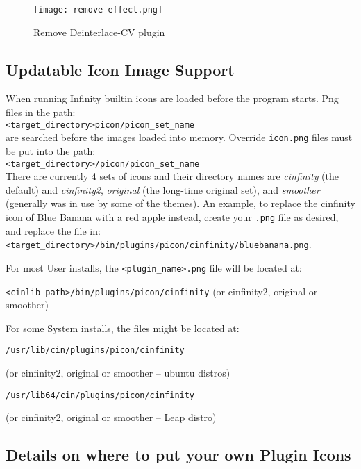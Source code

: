 \begin{figure}[htpb]
    \centering
    \texttt{[image: remove-effect.png]}
    \caption{Remove Deinterlace-CV plugin}
    \label{fig:remove-effect}
\end{figure}

\subsection{Updatable Icon Image Support}%
\label{sub:updatable_icon_image_support}

When running \CGG{} Infinity builtin icons are loaded before the
program starts. Png files in the path:\\
\texttt{<target\_directory>picon/picon\_set\_name}\\
are searched before the images loaded into memory. Override
\texttt{icon.png} files must be put into the path:\\
\texttt{<target\_directory>/picon/picon\_set\_name}\\
There are currently 4 sets of icons and their directory names are
\textit{cinfinity} (the default) and \textit{cinfinity2},
\textit{original} (the long-time original set), and
\textit{smoother} (generally was in use by some of the themes). An
example, to replace the cinfinity icon of Blue Banana with a red
apple instead, create your \texttt{.png} file as desired, and replace the
file in:\\
\texttt{<target\_directory>/bin/plugins/picon/cinfinity/bluebanana.png}.

For most User installs, the \texttt{<plugin\_name>.png} file will be located at:

\texttt{<cinlib\_path>/bin/plugins/picon/cinfinity} (or cinfinity2, original or smoother)

For some System installs, the files might be located at:

\texttt{/usr/lib/cin/plugins/picon/cinfinity}

(or cinfinity2, original or smoother -- ubuntu distros)

\texttt{/usr/lib64/cin/plugins/picon/cinfinity}

(or cinfinity2, original or smoother -- Leap distro)

\subsection{Details on where to put your own Plugin Icons}%
\label{sub:details_put_plugin_icons}

